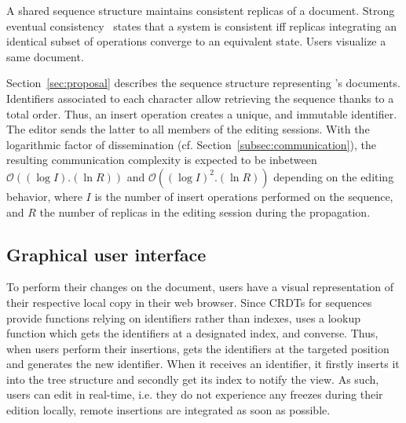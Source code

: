 A shared sequence structure maintains consistent replicas of a document. Strong
eventual consistency~\cite{shapiro2011comprehensive} states that a system is
consistent iff replicas integrating an identical subset of operations converge
to an equivalent state. Users visualize a same document.

Section~\ref{sec:proposal} describes the sequence structure representing
\CRATE's documents. Identifiers associated to each character allow retrieving
the sequence thanks to a total order. Thus, an insert operation creates a
unique, and immutable identifier. The editor sends the latter to all members of
the editing sessions. With the logarithmic factor of dissemination
(cf. Section~\ref{subsec:communication}), the resulting communication complexity
is expected to be inbetween $\mathcal{O}((\log I).(\ln R))$ and
$\mathcal{O}((\log I)^2.(\ln R))$ depending on the editing behavior, where $I$
is the number of insert operations performed on the sequence, and $R$ the number
of replicas in the editing session during the propagation.
    
\subsection{Graphical user interface}

To perform their changes on the document, users have a visual representation of
their respective local copy in their web browser.  Since CRDTs for sequences
provide functions relying on identifiers rather than indexes, \CRATE uses a
lookup function which gets the identifiers at a designated index, and converse.
Thus, when users perform their insertions, \CRATE gets the identifiers at the
targeted position and generates the new identifier. When it receives an
identifier, it firstly inserts it into the tree structure and secondly get its
index to notify the view. As such, users can edit in real-time, i.e. they do not
experience any freezes during their edition locally, remote insertions are
integrated as soon as possible.




